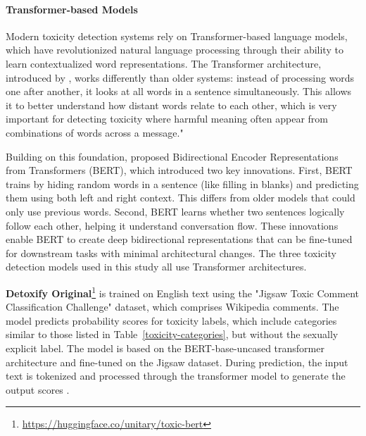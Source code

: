 \paragraph{Transformer-based Models}
Modern toxicity detection systems rely on Transformer-based language models, which have revolutionized natural language processing through their ability to learn contextualized word representations. The Transformer architecture, introduced by \citet{vaswani:2017}, works differently than older systems: instead of processing words one after another, it looks at all words in a sentence simultaneously. This allows it to better understand how distant words relate to each other, which is very important for detecting toxicity where harmful meaning often appear from combinations of words across a message."

Building on this foundation, \citet{devlin:2019} proposed Bidirectional Encoder Representations from Transformers (BERT), which introduced two key innovations. First, BERT trains by hiding random words in a sentence (like filling in blanks) and predicting them using both left and right context. This differs from older models that could only use previous words. Second, BERT learns whether two sentences logically follow each other, helping it understand conversation flow. These innovations enable BERT to create deep bidirectional representations that can be fine-tuned for downstream tasks with minimal architectural changes. The three toxicity detection models used in this study all use Transformer architectures.


\textbf{Detoxify Original}\footnote{\url{https://huggingface.co/unitary/toxic-bert}} is trained on English text using the "Jigsaw Toxic Comment Classification Challenge" dataset, which comprises Wikipedia comments. The model predicts probability scores for toxicity labels, which include categories similar to those listed in Table~\ref{toxicity-categories}, but without the sexually explicit label. The model is based on the BERT-base-uncased transformer architecture and fine-tuned on the Jigsaw dataset. During prediction, the input text is tokenized and processed through the transformer model to generate the output scores \cite{detoxify:medium}.


